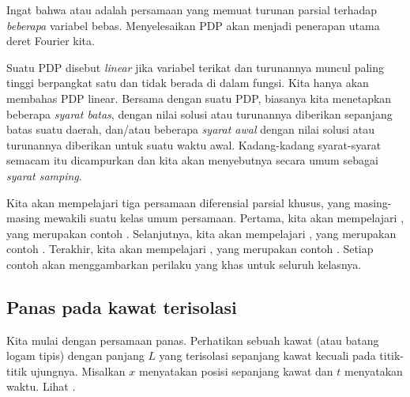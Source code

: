 

Ingat bahwa \emph{} atau
\emph{} adalah persamaan yang memuat turunan parsial
terhadap \emph{beberapa} variabel bebas.  Menyelesaikan PDP
akan menjadi penerapan utama deret Fourier kita.

Suatu PDP disebut \emph{linear} jika variabel terikat
dan turunannya muncul paling tinggi berpangkat satu dan tidak berada di dalam
fungsi.  Kita hanya akan membahas PDP linear.  Bersama dengan suatu PDP\@,
biasanya kita menetapkan beberapa
\emph{syarat batas},
dengan nilai solusi atau turunannya diberikan sepanjang
batas suatu daerah, dan/atau
beberapa 
\emph{syarat awal} dengan nilai
solusi atau turunannya diberikan untuk suatu waktu awal.
Kadang-kadang syarat-syarat semacam itu dicampurkan dan kita akan menyebutnya
secara umum sebagai 
\emph{syarat samping}.

Kita akan mempelajari tiga
persamaan diferensial parsial khusus, yang masing-masing mewakili suatu
kelas umum persamaan.  Pertama, kita akan mempelajari
\emph{}, yang merupakan contoh
\emph{}.  Selanjutnya, kita akan mempelajari
\emph{}, yang merupakan contoh
\emph{}.  Terakhir, kita akan mempelajari
\emph{}, yang merupakan contoh
\emph{}.  Setiap contoh akan menggambarkan
perilaku yang khas untuk seluruh kelasnya.

\subsection{Panas pada kawat terisolasi}

Kita mulai dengan persamaan panas.
Perhatikan sebuah kawat (atau batang logam tipis) dengan panjang $L$
yang terisolasi sepanjang kawat
kecuali pada titik-titik ujungnya.
Misalkan $x$ menyatakan posisi sepanjang kawat dan $t$ menyatakan waktu.
Lihat .

\begin{myfig}
\capstart
{}
\caption{Kawat terisolasi.\label{heat:wirefig}}
\end{myfig}

